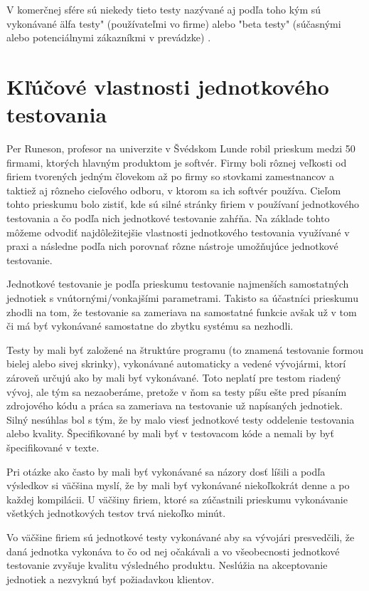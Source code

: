 \documentclass[11pt,twoside,slovak,a4paper]{article}
\begin{document}
			V komerčnej sfére sú niekedy tieto testy nazývané aj podľa toho kým sú vykonávané \"alfa testy" (používateľmi vo firme) alebo "beta testy" (súčasnými alebo potenciálnymi zákazníkmi v prevádzke) \cite{Alba2008}.
	
	\newpage
	\section{Kľúčové vlastnosti jednotkového testovania}
	
	Per Runeson, profesor na univerzite v Švédskom Lunde robil prieskum medzi 50 firmami, ktorých hlavným produktom je softvér\cite{Runeson2006}. Firmy boli rôznej veľkosti od firiem tvorených jedným človekom až po firmy so stovkami zamestnancov a taktiež aj rôzneho cieľového odboru, v ktorom sa ich softvér používa. Cieľom tohto prieskumu bolo zistiť, kde sú silné stránky firiem v používaní jednotkového testovania a čo podľa nich jednotkové testovanie zahŕňa. Na základe tohto môžeme odvodiť najdôležitejšie vlastnosti jednotkového testovania využívané v praxi a následne podľa nich porovnať rôzne nástroje umožňujúce jednotkové testovanie.
	
	Jednotkové testovanie je podľa prieskumu testovanie najmenších samostatných jednotiek s vnútornými/vonkajšími parametrami. Takisto sa účastníci prieskumu zhodli na tom, že testovanie sa zameriava na samostatné funkcie avšak už v tom či má byť vykonávané samostatne do zbytku systému sa nezhodli.
	
	Testy by mali byť založené na štruktúre programu (to znamená testovanie formou bielej alebo sivej skrinky), vykonávané automaticky a vedené vývojármi, ktorí zároveň určujú ako by mali byť vykonávané. Toto neplatí pre testom riadený vývoj, ale tým sa nezaoberáme, pretože v ňom sa testy píšu ešte pred písaním zdrojového kódu a práca sa zameriava na testovanie už napísaných jednotiek. Silný nesúhlas bol s tým, že by malo viesť jednotkové testy oddelenie testovania alebo kvality. Špecifikované by mali byť v testovacom kóde a nemali by byť špecifikované v texte.
	
	Pri otázke ako často by mali byť vykonávané sa názory dosť líšili a podľa výsledkov si väčšina myslí, že by mali byť vykonávané niekoľkokrát denne a po každej kompilácii. U väčšiny firiem, ktoré sa zúčastnili prieskumu vykonávanie všetkých jednotkových testov trvá niekoľko minút.
	
	Vo väčšine firiem sú jednotkové testy vykonávané aby sa vývojári presvedčili, že daná jednotka vykonáva to čo od nej očakávali a vo všeobecnosti jednotkové testovanie zvyšuje kvalitu výsledného produktu. Neslúžia na akceptovanie jednotiek a nezvyknú byť požiadavkou klientov.
	
\end{document}
